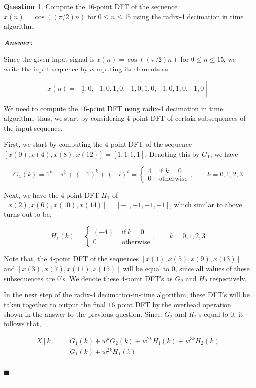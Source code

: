 \documentclass[12pt]{article}
\theoremstyle{definition}
\newtheorem{question}{Question}
\newenvironment{answer}{
    \textbf{\textit{Answer:}} \qquad
}{\hfill $\blacksquare$ \\ \begin{center}
    \rule{0.6\linewidth}{0.5px}    
\end{center}
}
\begin{document}
\begin{question}
    Compute the $16$-point DFT of the sequence $x(n) = \cos((\pi/2)n)$ for $0 \leq n \leq 15$ using the radix-4 decimation in time algorithm.
\end{question}

\begin{answer}
    Since the given input signal is $x(n) = \cos((\pi/2)n)$ for $0 \leq n \leq 15$, we write the input sequence by computing its elements as 

    $$
    x(n) = [\underset{\uparrow}{1}, 0, -1, 0, 1, 0, -1, 0, 1, 0, -1, 0, 1, 0, -1, 0]
    $$

    We need to compute the $16$-point DFT using radix-4 decimation in time algorithm, thus, we start by considering $4$-point DFT of certain subsequences of the input sequence.

    First, we start by computing the $4$-point DFT of the sequence $[x(0), x(4), x(8), x(12)] = [1, 1, 1, 1]$. Denoting this by $G_1$, we have 

    $$
    G_1(k) = 1^k + i^k + (-1)^k + (-i)^k = \begin{cases}
        4 & \text{ if } k = 0\\
        0 & \text{ otherwise}
    \end{cases}, \qquad k = 0, 1, 2, 3
    $$

    Next, we have the $4$-point DFT $H_1$ of $[x(2), x(6), x(10), x(14)] = [-1, -1, -1, -1]$, which similar to above turns out to be, 

    $$
    H_1(k) = \begin{cases}
        (-4) & \text{ if } k = 0\\
        0 & \text{ otherwise} 
    \end{cases}, \qquad k = 0, 1, 2, 3
    $$

    Note that, the $4$-point DFT of the sequences $[x(1), x(5), x(9), x(13)]$ and $[x(3), x(7), x(11), x(15)]$ will be equal to $0$, since all values of these subsequences are $0$'s. We denote these $4$-point DFT's as $G_2$ and $H_2$ respectively. 

    In the next step of the radix-4 decimation-in-time algorithm, these DFT's will be taken together to output the final $16$ point DFT by the overhead operation shown in the answer to the previous question. Since, $G_2$ and $H_2$'s equal to $0$, it follows that, 

    \begin{align*}
        X[k]
        & = G_1(k) + w^k G_2(k) + w^{2k} H_1(k) + w^{3k} H_2(k)\\
        & = G_1(k) + w^{2k} H_1(k)\\
    \end{align*}


\end{answer}
\end{document}
